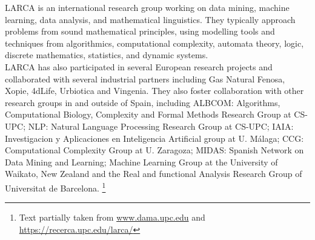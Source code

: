 LARCA is an international research group working on data mining, machine learning, data analysis, and mathematical linguistics. They typically approach problems from sound mathematical principles, using modelling tools and techniques from algorithmics, computational complexity, automata theory, logic, discrete mathematics, statistics, and dynamic systems. \\

LARCA has also participated in several European research projects and collaborated with several industrial partners including Gas Natural Fenosa, Xopie, 4dLife, Urbiotica and Vingenia. They also foster collaboration with other research groups in and outside of Spain, including ALBCOM: Algorithms, Computational Biology, Complexity and Formal Methods Research Group at CS-UPC; NLP: Natural Language Processing Research Group at CS-UPC; IAIA: Investigacion y Aplicaciones en Inteligencia Artificial group at U. M\'alaga; CCG: Computational Complexity Group at U. Zaragoza; MIDAS: Spanish Network on Data Mining and Learning; Machine Learning Group at the University of Waikato, New Zealand and the Real and functional Analysis Research Group of Universitat de Barcelona. \footnote{Text partially taken from \url{www.dama.upc.edu} and \url{https://recerca.upc.edu/larca/}}
